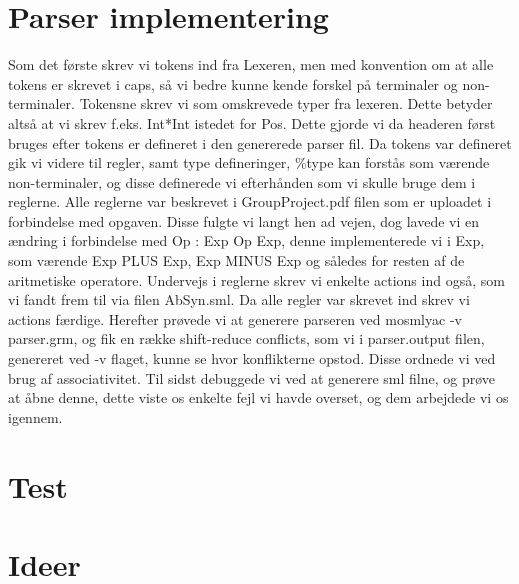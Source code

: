 \documentclass[11pt,a4paper]{article}
\begin{document}
\section*{Parser implementering}
Som det første skrev vi tokens ind fra Lexeren, men med konvention om at alle tokens er skrevet i caps, så vi bedre kunne kende forskel på terminaler og non-terminaler. Tokensne skrev vi som omskrevede typer fra lexeren. Dette betyder altså at vi skrev f.eks. Int*Int istedet for Pos. Dette gjorde vi da headeren først bruges efter tokens er defineret i den genererede parser fil.
Da tokens var defineret gik vi videre til regler, samt type defineringer, \%type kan forstås som værende non-terminaler, og disse definerede vi efterhånden som vi skulle bruge dem i reglerne. Alle reglerne var beskrevet i GroupProject.pdf filen som er uploadet i forbindelse med opgaven. Disse fulgte vi langt hen ad vejen, dog lavede vi en ændring i forbindelse med Op : Exp Op Exp, denne implementerede vi i Exp, som værende Exp PLUS Exp, Exp MINUS Exp og således for resten af de aritmetiske operatore. Undervejs i reglerne skrev vi enkelte actions ind også, som vi fandt frem til via filen AbSyn.sml. Da alle regler var skrevet ind skrev vi actions færdige. Herefter prøvede vi at generere parseren ved mosmlyac -v parser.grm, og fik en række shift-reduce conflicts, som vi i parser.output filen, genereret ved -v flaget, kunne se hvor konflikterne opstod. Disse ordnede vi ved brug af associativitet. Til sidst debuggede vi ved at generere sml filne, og prøve at åbne denne, dette viste os enkelte fejl vi havde overset, og dem arbejdede vi os igennem.




\section*{Test}

\section*{Ideer}
\end{document}

